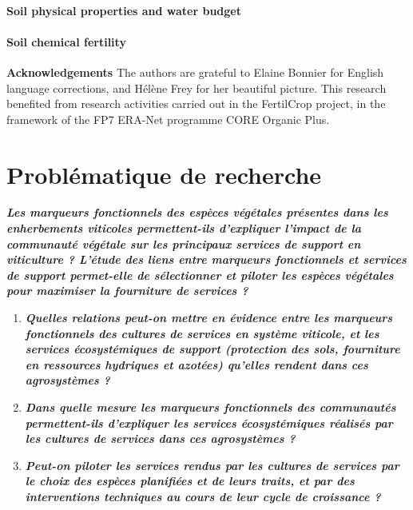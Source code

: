 \paragraph{Soil physical properties and water budget}

\paragraph{Soil chemical fertility}


\textbf{Acknowledgements}
The authors are grateful to Elaine Bonnier for English language corrections, and Hélène Frey for her beautiful picture. This research benefited from research activities carried out in the FertilCrop project, in the framework of the FP7 ERA-Net programme CORE Organic Plus. 

\section{Problématique de recherche}


\medskip
\noindent\textbf{\textit{Les marqueurs fonctionnels des espèces végétales présentes dans les enherbements viticoles permettent-ils d'expliquer l'impact de la communauté végétale sur les principaux services de support en viticulture ? L'étude des liens entre marqueurs fonctionnels et services de support permet-elle de sélectionner et piloter les espèces végétales pour maximiser la fourniture de services ?}}
\medskip


\begin{enumerate}[leftmargin=*]
\item \textbf{\textit{Quelles relations peut-on mettre en évidence entre les marqueurs fonctionnels des cultures de services en système viticole, et les services écosystémiques de support (protection des sols, fourniture en ressources hydriques et azotées) qu'elles rendent dans ces agrosystèmes ?}}
\item \textbf{\textit{Dans quelle mesure les marqueurs fonctionnels des communautés permettent-ils d'expliquer les services écosystémiques réalisés par les cultures de services dans ces agrosystèmes ?}}
\item \textbf{\textit{Peut-on piloter les services rendus par les cultures de services par le choix des espèces planifiées et de leurs traits, et par des interventions techniques au cours de leur cycle de croissance ?}}
\end{enumerate}

